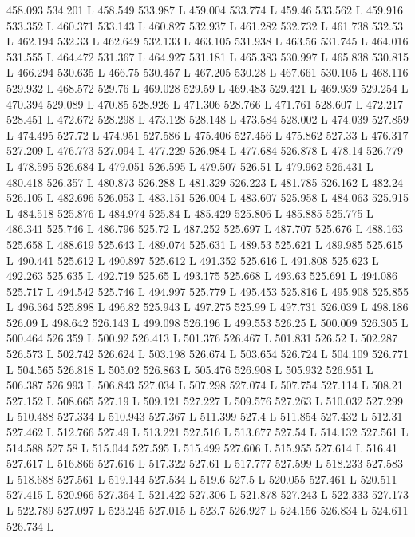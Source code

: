 458.093 534.201 L
458.549 533.987 L
459.004 533.774 L
459.46 533.562 L
459.916 533.352 L
460.371 533.143 L
460.827 532.937 L
461.282 532.732 L
461.738 532.53 L
462.194 532.33 L
462.649 532.133 L
463.105 531.938 L
463.56 531.745 L
464.016 531.555 L
464.472 531.367 L
464.927 531.181 L
465.383 530.997 L
465.838 530.815 L
466.294 530.635 L
466.75 530.457 L
467.205 530.28 L
467.661 530.105 L
468.116 529.932 L
468.572 529.76 L
469.028 529.59 L
469.483 529.421 L
469.939 529.254 L
470.394 529.089 L
470.85 528.926 L
471.306 528.766 L
471.761 528.607 L
472.217 528.451 L
472.672 528.298 L
473.128 528.148 L
473.584 528.002 L
474.039 527.859 L
474.495 527.72 L
474.951 527.586 L
475.406 527.456 L
475.862 527.33 L
476.317 527.209 L
476.773 527.094 L
477.229 526.984 L
477.684 526.878 L
478.14 526.779 L
478.595 526.684 L
479.051 526.595 L
479.507 526.51 L
479.962 526.431 L
480.418 526.357 L
480.873 526.288 L
481.329 526.223 L
481.785 526.162 L
482.24 526.105 L
482.696 526.053 L
483.151 526.004 L
483.607 525.958 L
484.063 525.915 L
484.518 525.876 L
484.974 525.84 L
485.429 525.806 L
485.885 525.775 L
486.341 525.746 L
486.796 525.72 L
487.252 525.697 L
487.707 525.676 L
488.163 525.658 L
488.619 525.643 L
489.074 525.631 L
489.53 525.621 L
489.985 525.615 L
490.441 525.612 L
490.897 525.612 L
491.352 525.616 L
491.808 525.623 L
492.263 525.635 L
492.719 525.65 L
493.175 525.668 L
493.63 525.691 L
494.086 525.717 L
494.542 525.746 L
494.997 525.779 L
495.453 525.816 L
495.908 525.855 L
496.364 525.898 L
496.82 525.943 L
497.275 525.99 L
497.731 526.039 L
498.186 526.09 L
498.642 526.143 L
499.098 526.196 L
499.553 526.25 L
500.009 526.305 L
500.464 526.359 L
500.92 526.413 L
501.376 526.467 L
501.831 526.52 L
502.287 526.573 L
502.742 526.624 L
503.198 526.674 L
503.654 526.724 L
504.109 526.771 L
504.565 526.818 L
505.02 526.863 L
505.476 526.908 L
505.932 526.951 L
506.387 526.993 L
506.843 527.034 L
507.298 527.074 L
507.754 527.114 L
508.21 527.152 L
508.665 527.19 L
509.121 527.227 L
509.576 527.263 L
510.032 527.299 L
510.488 527.334 L
510.943 527.367 L
511.399 527.4 L
511.854 527.432 L
512.31 527.462 L
512.766 527.49 L
513.221 527.516 L
513.677 527.54 L
514.132 527.561 L
514.588 527.58 L
515.044 527.595 L
515.499 527.606 L
515.955 527.614 L
516.41 527.617 L
516.866 527.616 L
517.322 527.61 L
517.777 527.599 L
518.233 527.583 L
518.688 527.561 L
519.144 527.534 L
519.6 527.5 L
520.055 527.461 L
520.511 527.415 L
520.966 527.364 L
521.422 527.306 L
521.878 527.243 L
522.333 527.173 L
522.789 527.097 L
523.245 527.015 L
523.7 526.927 L
524.156 526.834 L
524.611 526.734 L
